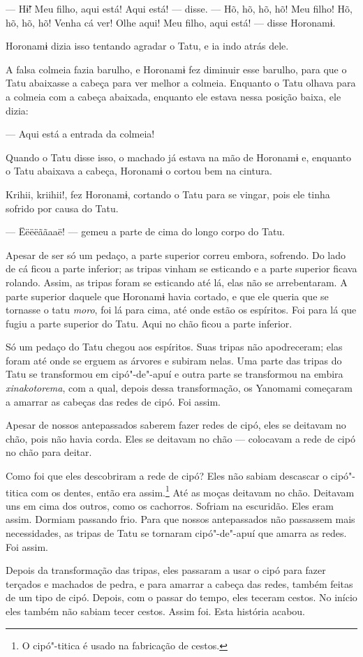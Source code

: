 --- Hɨ̃! Meu filho, aqui está! Aqui está! --- disse. --- Hõ, hõ, hõ,
hõ! Meu filho! Hõ, hõ, hõ, hõ! Venha cá ver! Olhe aqui! Meu filho, aqui
está! --- disse Horonamɨ. 

Horonamɨ dizia isso tentando agradar o Tatu, e ia indo atrás dele. 


A falsa colmeia fazia barulho, e Horonamɨ fez diminuir esse barulho,
para que o Tatu abaixasse a cabeça para ver melhor a colmeia. Enquanto o
Tatu olhava para a colmeia com a cabeça abaixada, enquanto ele estava
nessa posição baixa, ele dizia:

--- Aqui está a entrada da colmeia! 

Quando o Tatu disse isso, o machado já estava na mão de Horonamɨ e,
enquanto o Tatu abaixava a cabeça, Horonamɨ o cortou bem na cintura. 

Krihii, kriihii!, fez Horonamɨ, cortando o Tatu para se vingar, pois
ele tinha sofrido por causa do Tatu.

--- Ëëëëããaaë! --- gemeu a parte de cima do longo corpo do Tatu. 

Apesar de ser só um pedaço, a parte superior correu embora, sofrendo. Do
lado de cá ficou a parte inferior; as tripas vinham se esticando e a
parte superior ficava rolando. Assim, as tripas foram se esticando até
lá, elas não se arrebentaram. A parte superior daquele que Horonamɨ
havia cortado, e que ele queria que se tornasse o tatu \emph{moro}, foi
lá para cima, até onde estão os espíritos. Foi para lá que fugiu a parte
superior do Tatu. Aqui no chão ficou a parte inferior. 

Só um pedaço do Tatu chegou aos espíritos. Suas tripas não apodreceram;
elas foram até onde se erguem as árvores e subiram nelas. Uma parte das
tripas do Tatu se transformou em cipó"-de"-apuí e outra parte se
transformou na embira \emph{xinakotorema}, com a qual, depois dessa
transformação, os Yanomami começaram a amarrar as cabeças das redes de
cipó. Foi assim.

Apesar de nossos antepassados saberem fazer redes de cipó, eles se
deitavam no chão, pois não havia corda. Eles se deitavam no chão ---
colocavam a rede de cipó no chão para deitar. 

Como foi que eles descobriram a rede de cipó? Eles não sabiam descascar
o cipó"-titica com os dentes, então era assim.\footnote{  O cipó"-titica é usado na fabricação de cestos.}  Até as
moças deitavam no chão. Deitavam uns em cima dos outros, como os
cachorros. Sofriam na escuridão. Eles eram assim. Dormiam passando frio.
Para que nossos antepassados não passassem mais necessidades, as tripas
de Tatu se tornaram cipó"-de"-apuí que amarra as redes. Foi assim. 

Depois da transformação das tripas, eles passaram a usar o cipó para
fazer terçados e machados de pedra, e para amarrar a cabeça das redes,
também feitas de um tipo de cipó. Depois, com o passar do tempo, eles
teceram cestos. No início eles também não sabiam tecer cestos. Assim
foi. Esta história acabou.

 
